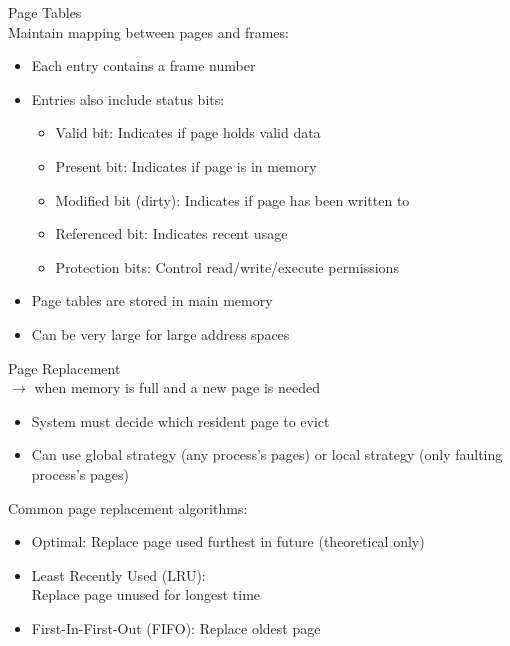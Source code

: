
\begin{theorem}{Page Tables} \\ Maintain mapping between pages and frames:
    \begin{itemize}
        \item Each entry contains a frame number
        \item Entries also include status bits:
            \begin{itemize}
                \item Valid bit: Indicates if page holds valid data
                \item Present bit: Indicates if page is in memory
                \item Modified bit (dirty): Indicates if page has been written to
                \item Referenced bit: Indicates recent usage
                \item Protection bits: Control read/write/execute permissions
            \end{itemize}
        \item Page tables are stored in main memory
        \item Can be very large for large address spaces
    \end{itemize}
\end{theorem}

\begin{concept}{Page Replacement}\\
    $\rightarrow$ when memory is full and a new page is needed
    \begin{itemize}
        \item System must decide which resident page to evict
        \item Can use global strategy (any process's pages) or local strategy (only faulting process's pages)
    \end{itemize}
        Common page replacement algorithms:
            \begin{itemize}
                \item Optimal: Replace page used furthest in future (theoretical only)
                \item Least Recently Used (LRU): \\ Replace page unused for longest time
                \item First-In-First-Out (FIFO): Replace oldest page
            \end{itemize}
\end{concept}


